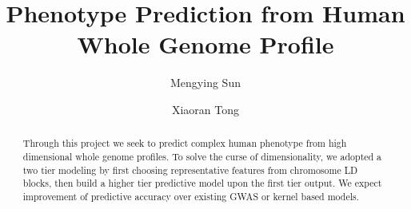 \documentclass[acmtog, authorversion]{acmart}
\begin{document}
\title{Phenotype Prediction from Human Whole Genome Profile}
\author{Mengying Sun}
\author{Xiaoran Tong}

\renewcommand\shortauthors{Zhou, G. et al}

\begin{abstract}
  Through this project we seek to predict complex human phenotype from high dimensional whole genome profiles. To solve the curse of dimensionality, we adopted a two tier modeling by first choosing representative features from chromosome LD blocks, then build a higher tier predictive model upon the first tier output. We expect improvement of predictive accuracy over existing GWAS or kernel based models.
\end{abstract}


%
%

\end{document}
